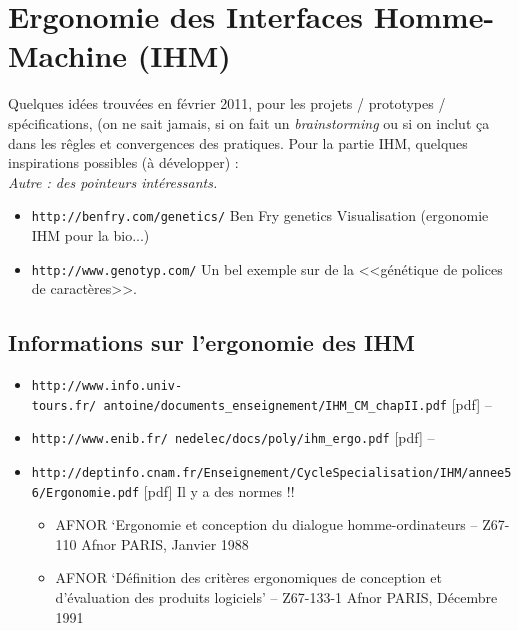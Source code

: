 \documentclass[11pt,twoside,a4paper]{article}
\begin{document}
\section{Ergonomie des Interfaces Homme-Machine (IHM)}

Quelques id{\'e}es trouv{\'e}es en f{\'e}vrier 2011, pour les projets / prototypes / sp{\'e}cifications, (on ne sait jamais, si on fait un \emph{brainstorming} ou si on inclut \c{c}a dans les r{\^e}gles et convergences des pratiques. Pour la partie IHM, quelques inspirations possibles ({\`a} d{\'e}velopper) :~\\

\textit{Autre : des pointeurs int{\'e}ressants. }

\begin{itemize}
	\item[] \texttt{http://benfry.com/genetics/} Ben Fry genetics Visualisation (ergonomie IHM pour la bio...) 
	\item[] \texttt{http://www.genotyp.com/} Un bel exemple sur de la <<g{\'e}n{\'e}tique de polices de caract{\`e}res>>. 
\end{itemize}

\subsection{Informations sur l'ergonomie des IHM}

\begin{itemize}
	\item[] \texttt{http://www.info.univ-tours.fr/~antoine/documents\_enseignement/IHM\_CM\_chapII.pdf} [pdf] -- 
	\item[] \texttt{http://www.enib.fr/~nedelec/docs/poly/ihm\_ergo.pdf} [pdf] -- 
	\item[] \texttt{http://deptinfo.cnam.fr/Enseignement/CycleSpecialisation/IHM/annee56/Ergonomie.pdf} [pdf] Il y a des normes !!
	\begin{itemize}
		\item AFNOR ‘Ergonomie et conception du dialogue homme-ordinateurs -- Z67-110 Afnor PARIS, Janvier 1988
		\item AFNOR ‘D{\'e}finition des crit{\`e}res ergonomiques de conception et d'{\'e}valuation des produits logiciels' -- Z67-133-1 Afnor PARIS, D{\'e}cembre 1991
	\end{itemize}
\end{itemize}~\\
 
\end{document}
